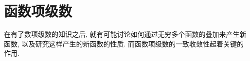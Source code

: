 
\chapter{函数项级数}\label{ch:13}

在有了数项级数的知识之后, 就有可能讨论如何通过无穷多个函数的叠加来产生新函数, 以及研究这样产生的新函数的性质. 而函数项级数的一致收敛性起着关键的作用.




